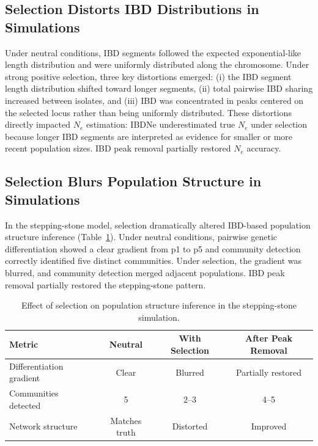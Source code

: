 \documentclass[11pt]{article}
\begin{document}
\subsection{Selection Distorts IBD Distributions in Simulations}

Under neutral conditions, IBD segments followed the expected exponential-like length distribution and were uniformly distributed along the chromosome. Under strong positive selection, three key distortions emerged: (i) the IBD segment length distribution shifted toward longer segments, (ii) total pairwise IBD sharing increased between isolates, and (iii) IBD was concentrated in peaks centered on the selected locus rather than being uniformly distributed. These distortions directly impacted $N_e$ estimation: IBDNe underestimated true $N_e$ under selection because longer IBD segments are interpreted as evidence for smaller or more recent population sizes. IBD peak removal partially restored $N_e$ accuracy.

\subsection{Selection Blurs Population Structure in Simulations}

In the stepping-stone model, selection dramatically altered IBD-based population structure inference (Table~\ref{tab:sim_structure}). Under neutral conditions, pairwise genetic differentiation showed a clear gradient from p1 to p5 and community detection correctly identified five distinct communities. Under selection, the gradient was blurred, and community detection merged adjacent populations. IBD peak removal partially restored the stepping-stone pattern.

\begin{table}[htbp]
\centering
\caption{Effect of selection on population structure inference in the stepping-stone simulation.}
\label{tab:sim_structure}
\begin{tabular}{lccc}
\toprule
\textbf{Metric} & \textbf{Neutral} & \textbf{With Selection} & \textbf{After Peak Removal} \\
\midrule
Differentiation gradient & Clear & Blurred & Partially restored \\
Communities detected & 5 & 2--3 & 4--5 \\
Network structure & Matches truth & Distorted & Improved \\
\bottomrule
\end{tabular}
\end{table}
\end{document}
